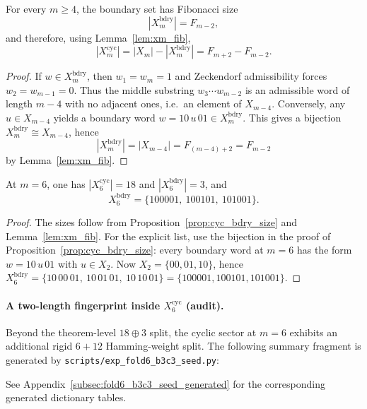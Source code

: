 \begin{proposition}\label{prop:cyc_bdry_size}
For every $m\ge 4$, the boundary set has Fibonacci size
\[
|X_m^{\mathrm{bdry}}|=F_{m-2},
\]
and therefore, using Lemma~\ref{lem:xm_fib},
\[
|X_m^{\mathrm{cyc}}|=|X_m|-|X_m^{\mathrm{bdry}}|=F_{m+2}-F_{m-2}.
\]
\end{proposition}
\begin{proof}
If $w\in X_m^{\mathrm{bdry}}$, then $w_1=w_m=1$ and Zeckendorf admissibility forces $w_2=w_{m-1}=0$.
Thus the middle substring $w_3\cdots w_{m-2}$ is an admissible word of length $m-4$ with no adjacent ones, i.e.\ an element of $X_{m-4}$.
Conversely, any $u\in X_{m-4}$ yields a boundary word $w=10\,u\,01\in X_m^{\mathrm{bdry}}$.
This gives a bijection $X_m^{\mathrm{bdry}}\cong X_{m-4}$, hence
\[
|X_m^{\mathrm{bdry}}|=|X_{m-4}|=F_{(m-4)+2}=F_{m-2}
\]
by Lemma~\ref{lem:xm_fib}.
\end{proof}

\begin{corollary}[Canonical $18\oplus 3$ split at $m=6$]\label{prop:cyc_bdry_6}
At $m=6$, one has $|X_6^{\mathrm{cyc}}|=18$ and $|X_6^{\mathrm{bdry}}|=3$, and
\[
X_6^{\mathrm{bdry}}=\{100001,\ 100101,\ 101001\}.
\]
\end{corollary}
\begin{proof}
The sizes follow from Proposition~\ref{prop:cyc_bdry_size} and Lemma~\ref{lem:xm_fib}.
For the explicit list, use the bijection in the proof of
Proposition~\ref{prop:cyc_bdry_size}: every boundary word at $m=6$ has the form
$w=10\,u\,01$ with $u\in X_{2}$.
Now $X_2=\{00,01,10\}$, hence
$X_6^{\mathrm{bdry}}=\{10\,00\,01,\ 10\,01\,01,\ 10\,10\,01\}
=\{100001,100101,101001\}$.
\end{proof}

\paragraph{A two-length fingerprint inside \texorpdfstring{$X_6^{\mathrm{cyc}}$}{X6cyc} (audit).}
\AuditTag Beyond the theorem-level $18\oplus 3$ split, the cyclic sector at $m=6$ exhibits an additional rigid $6+12$ Hamming-weight split.
The following summary fragment is generated by \texttt{scripts/exp\_fold6\_b3c3\_seed.py}:

See Appendix~\ref{subsec:fold6_b3c3_seed_generated} for the corresponding generated dictionary tables.

